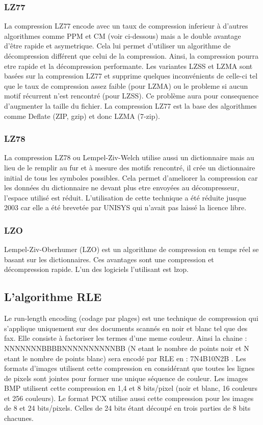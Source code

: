\documentclass[a4paper]{report}
\begin{document}
	\subsubsection{LZ77}
		La compression LZ77 encode avec un taux de compression inferieur à d'autres algorithmes comme PPM et CM (voir ci-dessous) mais a le double avantage d'être rapide et asymetrique. Cela lui permet d'utiliser un algorithme de décompression différent que celui de la compression. Ainsi, la compression pourra etre rapide et la décompression performante. Les variantes LZSS et LZMA sont basées sur la compression LZ77 et supprime quelques inconvénients de celle-ci tel que le taux de compression assez faible (pour LZMA) ou le probleme si aucun motif récurrent n'est rencontré (pour LZSS). Ce problème aura pour consequence d'augmenter la taille du fichier. La compression LZ77 est la base des algorithmes comme Deflate (ZIP, gzip) et donc LZMA (7-zip).
	\subsubsection{LZ78}
		La compression LZ78 ou Lempel-Ziv-Welch utilise aussi un dictionnaire mais au lieu de le remplir au fur et à mesure des motifs rencontré, il crée un dictionnaire initial de tous les symboles possibles. Cela permet d'ameliorer la compression car les données du dictionnaire ne devant plus etre envoyées au décompresseur, l'espace utilisé est réduit. L'utilisation de cette technique a été réduite jusque 2003 car elle a été brevetée par UNISYS qui n'avait pas laissé la licence libre.
	\subsubsection{LZO}
		Lempel-Ziv-Oberhumer (LZO) est un algorithme de compression en temps réel se basant sur les dictionnaires. Ces avantages sont une compression et décompression rapide. L'un des logiciels l'utilisant est lzop.
	\subsection{L'algorithme RLE}
		Le run-length encoding (codage par plages) est une technique de compression qui s'applique uniquement sur des documents scannés en noir et blanc tel que des fax. Elle consiste à factoriser les termes d'une meme couleur. Ainsi la chaine : NNNNNNNBBBBNNNNNNNNNNBB (N etant le nombre de points noir et N etant le nombre de points blanc) sera encodé par RLE en : 7N4B10N2B . Les formats d'images utilisent cette compression en considérant que toutes les lignes de pixels sont jointes pour former une unique séquence de couleur. Les images BMP utilisent cette compression en 1,4 et 8 bits/pixel (noir et blanc, 16 couleurs et 256 couleurs). Le format PCX utilise aussi cette compression pour les images de 8 et 24 bits/pixels. Celles de 24 bits étant découpé en trois parties de 8 bits chacunes.
\end{document}
